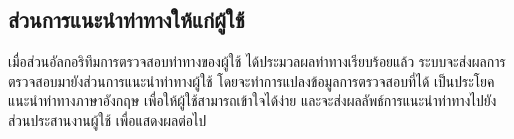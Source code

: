 \subsection{ส่วนการแนะนำท่าทางให้แก่ผู้ใช้}
เมื่อส่วนอัลกอริทึมการตรวจสอบท่าทางของผู้ใช้ ได้ประมวลผลท่าทางเรียบร้อยแล้ว ระบบจะส่งผลการตรวจสอบมายังส่วนการแนะนำท่าทางผู้ใช้ โดยจะทำการแปลงข้อมูลการตรวจสอบที่ได้ เป็นประโยคแนะนำท่าทางภาษาอังกฤษ เพื่อให้ผู้ใช้สามารถเข้าใจได้ง่าย และจะส่งผลลัพธ์การแนะนำท่าทางไปยังส่วนประสานงานผู้ใช้ เพื่อแสดงผลต่อไป
